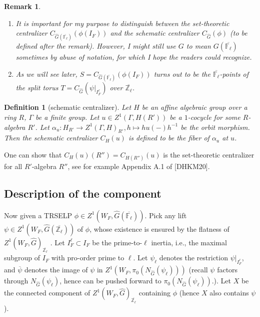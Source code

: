 \documentclass{article}
\newcommand{\red}[1]{\textcolor{red}{#1}}
\newtheorem*{remark}{Remark}
\newtheorem{definition}{Definition}
\begin{document}
	\begin{remark}
		\begin{enumerate}
			\item It is important for my purpose to distinguish between the set-theoretic centralizer $C_{\hat{G}(\overline{\mathbb{F}_\ell})}(\phi(I_F))$ and the schematic centralizer $C_{\hat{G}}(\phi)$ (to be defined after the remark). However, I might still use $G$ to mean $G(\overline{\mathbb{F}_{\ell}})$ sometimes by abuse of notation, for which I hope the readers could recognize.
			\item As we will see later, $S=C_{\hat{G}(\overline{\mathbb{F}_\ell})}(\phi(I_F))$ turns out to be the $\overline{\mathbb{F}_\ell}$-points of the split torus $T=C_{\hat{G}}(\psi|_{I_F^\ell})$ over $\overline{\mathbb{Z}_\ell}$.
		\end{enumerate} 
	\end{remark}
	
	\begin{definition}[schematic centralizer]
		Let $H$ be an affine algebraic group over a ring $R$, $\Gamma$ be a finite group. Let $u \in Z^1(\Gamma, H(R'))$ be a $1$-cocycle for some $R$-algebra $R'$. Let $\alpha_u: H_{R'} \to Z^1(\Gamma, H)_{R'}, h \mapsto hu(-)h^{-1}$ be the orbit morphism. Then the schematic centralizer $C_H(u)$ is defined to be the fiber of $\alpha_u$ at $u$.
		
		
	\end{definition}
	
	One can show that $C_H(u)(R'')=C_{H(R'')}(u)$ is the set-theoretic centralizer for all $R'$-algebra $R''$, see for example Appendix A.1 of [DHKM20].
	
	
	
	
	
	\subsection{Description of the component}
	
	Now given a TRSELP $\phi \in Z^1(W_F, \hat{G}(\overline{\mathbb{F}_\ell}))$. Pick any lift $\psi \in Z^1(W_F, \hat{G}(\overline{\mathbb{Z}_\ell}))$ of $\phi$, whose existence is ensured by the flatness of $Z^1(W_F, \hat{G})_{\overline{\mathbb{Z}_\ell}}$ %
	. Let $I_F^{\ell} \subset I_F$ be the prime-to-$\ell$ inertia, i.e., the maximal subgroup of $I_F$ with pro-order prime to $\ell$. Let $\psi_{\ell}$ denotes the restriction $\psi|_{I_F^{\ell}}$, and $\overline{\psi}$ denotes the image of $\psi$ in $Z^1(W_F, \pi_0(N_{\hat{G}}(\psi_{\ell})))$ (recall $\psi$ factors through $N_{\hat{G}}(\psi_{\ell})$, hence can be pushed forward to $\pi_0(N_{\hat{G}}(\psi_{\ell}))$.). Let $X$ be the connected component of $Z^1(W_F, \hat{G})_{\overline{\mathbb{Z}_\ell}}$ containing $\phi$ (hence $X$ also contains $\psi$). 
	
\end{document}
